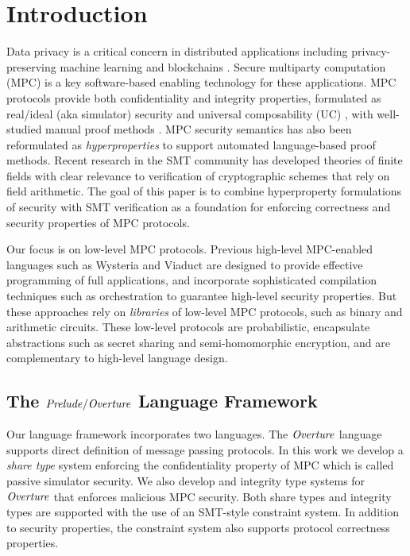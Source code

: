 \section{Introduction}

Data privacy is a critical concern in distributed applications
including privacy-preserving machine learning
\cite{li2021privacy,knott2021crypten,koch2020privacy,liu2020privacy}
and blockchains
\cite{ishai2009zero,lu2019honeybadgermpc,gao2022symmeproof,tomaz2020preserving}.
Secure multiparty computation (MPC) is a key software-based enabling
technology for these applications. MPC protocols provide both confidentiality
and integrity properties, formulated as real/ideal (aka simulator)
security and universal composability (UC) \cite{evans2018pragmatic},
with well-studied manual proof methods \cite{Lindell2017}.  MPC
security semantics has also been reformulated as
\emph{hyperproperties}
\cite{8429300,10.1145/3453483.3454074,skalka-near-ppdp24} to support
automated language-based proof methods. Recent research in the SMT
community has developed theories of finite fields \cite{SMFF} with
clear relevance to verification of cryptographic schemes that rely on
field arithmetic. The goal of this paper is to combine hyperproperty
formulations of security with SMT verification as a foundation for
enforcing correctness and security properties of MPC protocols.

Our focus is on low-level MPC protocols. Previous high-level
MPC-enabled languages such as Wysteria \cite{rastogi2014wysteria} and
Viaduct \cite{10.1145/3453483.3454074} are designed to provide
effective programming of full applications, and incorporate
sophisticated compilation techniques such as orchestration
\cite{viaduct-UC} to guarantee high-level security properties. But
these approaches rely on \emph{libraries} of low-level MPC protocols,
such as binary and arithmetic circuits. These low-level protocols are
probabilistic, encapsulate abstractions such as secret sharing and
semi-homomorphic encryption, and are complementary to high-level
language design.

\subsection{The $\mathit{Prelude}/\mathit{Overture}$ Language Framework}

Our language framework incorporates two languages. The $\mathit{Overture}$
language supports direct definition of message passing protocols.  In
this work we develop a \emph{share type} system enforcing the
confidentiality property of MPC which is called passive simulator
security. We also develop and integrity type systems for $\mathit{Overture}$
that enforces malicious MPC security. Both share types and integrity
types are supported with the use of an SMT-style constraint system.
In addition to security properties, the constraint system also
supports protocol correctness properties.

